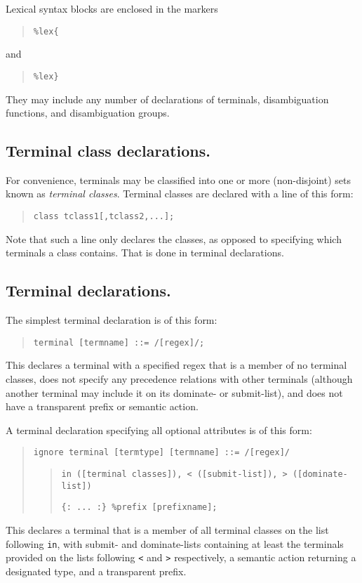 \documentclass[12pt,english,twoside]{report}
\begin{document}
Lexical syntax blocks are enclosed in the markers

\begin{quote}
\texttt{\%lex\{}
\end{quote}
and

\begin{quote}
\texttt{\%lex\}}
\end{quote}
They may include any number of declarations of terminals, disambiguation
functions, and disambiguation groups.


\subsection{Terminal class declarations.}

For convenience, terminals may be classified into one or more
(non-disjoint) sets known as \emph{terminal classes}. Terminal
classes are declared with a line of this form:

\begin{quote}
\texttt{class tclass1{[},tclass2,...];}
\end{quote}
Note that such a line only declares the classes, as opposed to specifying
which terminals a class contains. That is done in terminal declarations.


\subsection{\label{sub:Terminal-declarations.}Terminal declarations.}

The simplest terminal declaration is of this form:

\begin{quote}
\texttt{terminal {[}termname] ::= /{[}regex]/;}
\end{quote}
This declares a terminal with a specified regex that is a member of
no terminal classes, does not specify any precedence relations with
other terminals (although another terminal may include it on its dominate-
or submit-list), and does not have a transparent prefix or semantic
action.

A terminal declaration specifying all optional attributes is of this
form:

\begin{quote}
\texttt{ignore terminal {[}termtype] {[}termname] ::= /{[}regex]/}
\begin{quote}
\texttt{in ({[}terminal classes]), < ({[}submit-list]), > ({[}dominate-list])}

\texttt{\{: ... :\} \%prefix {[}prefixname];}
\end{quote}
\end{quote}
This declares a terminal that is a member of all terminal classes
on the list following \texttt{in}, with submit- and dominate-lists
containing at least the terminals provided on the lists following
\texttt{<} and \texttt{>} respectively, a semantic action returning
a designated type, and a transparent prefix.
\end{document}
